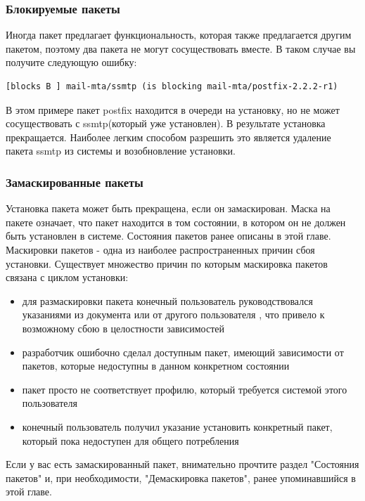 \documentclass[10pt]{book}
\begin{document}
\subsubsection{Блокируемые пакеты}
Иногда пакет предлагает функциональность, которая также предлагается другим пакетом, поэтому два пакета не могут сосуществовать вместе. В таком случае вы получите следующую ошибку:
 \begin{tcolorbox}
\begin{lstlisting}
[blocks B ] mail-mta/ssmtp (is blocking mail-mta/postfix-2.2.2-r1)
\end{lstlisting}
\end{tcolorbox}
В этом примере пакет postfix находится в очереди на установку, но не может сосуществовать с ssmtp(который уже установлен). В результате установка прекращается.
Наиболее легким способом разрешить это является удаление пакета ssmtp из системы и возобновление установки.

\subsubsection{Замаскированные пакеты}
Установка пакета может быть прекращена, если он замаскирован. Маска на пакете означает, что пакет находится в том состоянии, в котором он не должен быть установлен в системе. Состояния пакетов ранее описаны в этой главе. Маскировки пакетов - одна из наиболее распространенных причин сбоя установки. Существует множество причин по которым маскировка пакетов связана с циклом установки:
\begin{itemize} 
\item для размаскировки пакета конечный пользователь руководствовался указаниями из документа или от другого пользователя , что привело к возможному сбою в целостности зависимостей
\item разработчик ошибочно сделал доступным пакет, имеющий зависимости от пакетов, которые недоступны в данном конкретном состоянии
\item пакет просто не соответствует профилю, который требуется системой этого пользователя
\item конечный пользователь получил указание установить конкретный пакет, который пока недоступен для общего потребления 
\end{itemize}
Если у вас есть замаскированный пакет, внимательно прочтите раздел "Состояния пакетов"  и, при необходимости, "Демаскировка пакетов", ранее упоминавшийся в этой главе.
\end{document}
